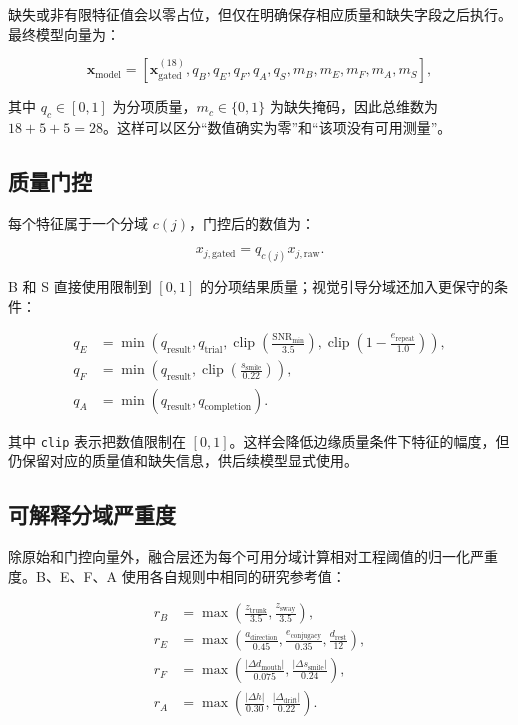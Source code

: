 \documentclass[11pt,a4paper]{article}
\begin{document}
缺失或非有限特征值会以零占位，但仅在明确保存相应质量和缺失字段之后执行。最终模型向量为：

\begin{equation}
\mathbf{x}_{\mathrm{model}}=
\left[
\mathbf{x}_{\mathrm{gated}}^{(18)},
q_B,q_E,q_F,q_A,q_S,
m_B,m_E,m_F,m_A,m_S
\right],
\end{equation}

其中 $q_c\in[0,1]$ 为分项质量，$m_c\in\{0,1\}$ 为缺失掩码，因此总维数为 $18+5+5=28$。这样可以区分“数值确实为零”和“该项没有可用测量”。

\subsection{质量门控}

每个特征属于一个分域 $c(j)$，门控后的数值为：

\begin{equation}
x_{j,\mathrm{gated}}=q_{c(j)}x_{j,\mathrm{raw}}.
\end{equation}

B 和 S 直接使用限制到 $[0,1]$ 的分项结果质量；视觉引导分域还加入更保守的条件：

\begin{align}
q_E &= \min\left(q_{\mathrm{result}},q_{\mathrm{trial}},
\operatorname{clip}\left(\frac{\mathrm{SNR}_{\min}}{3.5}\right),
\operatorname{clip}\left(1-\frac{e_{\mathrm{repeat}}}{1.0}\right)\right),\\
q_F &= \min\left(q_{\mathrm{result}},
\operatorname{clip}\left(\frac{s_{\mathrm{smile}}}{0.22}\right)\right),\\
q_A &= \min\left(q_{\mathrm{result}},q_{\mathrm{completion}}\right).
\end{align}

其中 \texttt{clip} 表示把数值限制在 $[0,1]$。这样会降低边缘质量条件下特征的幅度，但仍保留对应的质量值和缺失信息，供后续模型显式使用。

\subsection{可解释分域严重度}

除原始和门控向量外，融合层还为每个可用分域计算相对工程阈值的归一化严重度。B、E、F、A 使用各自规则中相同的研究参考值：

\begin{align}
r_B &= \max\left(\frac{z_{\mathrm{trunk}}}{3.5},\frac{z_{\mathrm{sway}}}{3.5}\right),\\
r_E &= \max\left(\frac{a_{\mathrm{direction}}}{0.45},
\frac{e_{\mathrm{conjugacy}}}{0.35},\frac{d_{\mathrm{rest}}}{12}\right),\\
r_F &= \max\left(\frac{|\Delta d_{\mathrm{mouth}}|}{0.075},
\frac{|\Delta s_{\mathrm{smile}}|}{0.24}\right),\\
r_A &= \max\left(\frac{|\Delta h|}{0.30},
\frac{|\Delta_{\mathrm{drift}}|}{0.22}\right).
\end{align}
\end{document}
